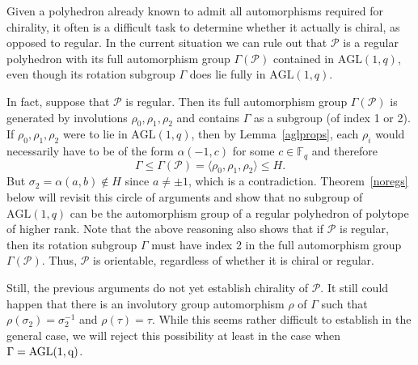 \documentclass[12pt]{article}
\theoremstyle{definition}\newtheorem{definition}{Definition}[section]
\begin{document}
Given a polyhedron already known to admit all automorphisms required for chirality, it often is a difficult task to determine whether it actually is chiral, as opposed to regular. In the current situation we can rule out that $\mathcal{P}$ is a regular polyhedron with its full automorphism group $\Gamma(\mathcal{P})$ contained in $\mathrm{AGL}(1,q)$, even though its rotation subgroup $\Gamma$ does lie fully in $\mathrm{AGL}(1,q)$. 

In fact, suppose that $\mathcal{P}$ is regular. Then its full automorphism group $\Gamma(\mathcal{P})$ is generated by involutions $\rho_0,\rho_1,\rho_2$ and contains $\Gamma$ as a subgroup (of index 1 or 2). If $\rho_0,\rho_1,\rho_2$ were to lie in $\mathrm{AGL}(1,q)$, then 
by Lemma~\ref{aglprops}, each $\rho_i$ would necessarily have to be of the form $\alpha(-1,c)$ for some $c\in\mathbb{F}_q$ and therefore
\[\Gamma\leq\Gamma(\mathcal{P})=\langle\rho_0,\rho_1,\rho_2\rangle \leq H.\]
But $\sigma_2=\alpha(a,b)\not\in H$ since $a\neq \pm 1$, which is a contradiction. Theorem~\ref{noregs} below will revisit this circle of arguments and show that no subgroup of $\mathrm{AGL}(1,q)$ can be the automorphism group of a regular polyhedron of polytope of higher rank. Note that the above reasoning also shows that if $\mathcal{P}$ is regular, then its rotation subgroup $\Gamma$ must have index 2 in the full automorphism group $\Gamma(\mathcal{P})$. Thus, $\mathcal{P}$ is orientable, regardless of whether it is chiral or regular.

Still, the previous arguments do not yet establish chirality of $\mathcal{P}$. It still could happen that there is an  involutory group automorphism $\rho$ of $\Gamma$ such that $\rho(\sigma_2)=\sigma_2^{-1}$ and $\rho(\tau)=\tau$. While this seems rather difficult to establish in the general case, we will reject this possibility at least in the case when $\Gamma=\rm{AGL}(1,q)$. 
\bigskip
\end{document}
